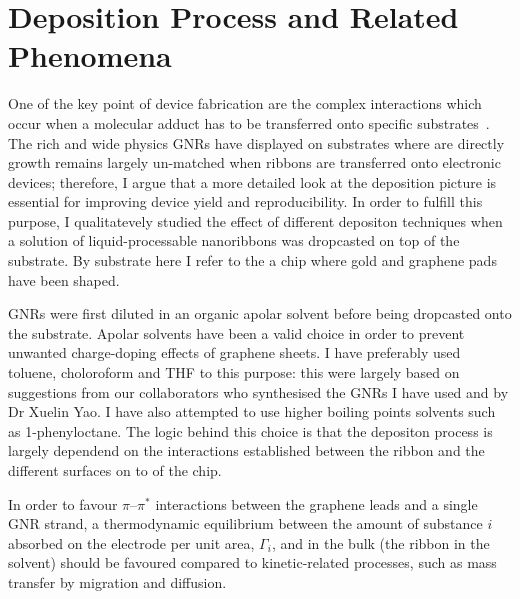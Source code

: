 \section{Deposition Process and Related Phenomena}\label{ch:fabrication:sec:deposition_process}

One of the key point of device fabrication are the complex interactions which occur when a molecular adduct has to be transferred onto specific substrates~\cite{nerngchamnong2013role, huskens2004model}. The rich and wide physics \glspl{GNR} have displayed on substrates where are directly growth remains largely un-matched when ribbons are transferred onto electronic devices; therefore, I argue that a more detailed look at the deposition picture is essential for improving device yield and reproducibility. In order to fulfill this purpose, I qualitatevely studied the effect of different depositon techniques when a solution of liquid-processable nanoribbons was dropcasted on top of the substrate. By substrate here I refer to the a chip where gold and graphene pads have been shaped.

\glspl{GNR} were first diluted in an organic apolar solvent before being dropcasted onto the substrate. Apolar solvents have been a valid choice in order to prevent unwanted charge-doping effects of graphene sheets. I have preferably used toluene, choloroform and \gls{THF} to this purpose: this were largely based on suggestions from our collaborators who synthesised the \glspl{GNR} I have used and by Dr Xuelin Yao. I have also attempted to use higher boiling points solvents such as 1-phenyloctane. The logic behind this choice is that the depositon process is largely dependend on the interactions established between the ribbon and the different surfaces on to of the chip.

In order to favour $\pi$--$\pi^*$ interactions between the graphene leads and a single \gls{GNR} strand, a thermodynamic equilibrium between the amount of substance $i$ absorbed on the electrode per unit area, $\Gamma_i$, and in the bulk (the ribbon in the solvent) should be favoured compared to kinetic-related processes, such as mass transfer by migration and diffusion.

